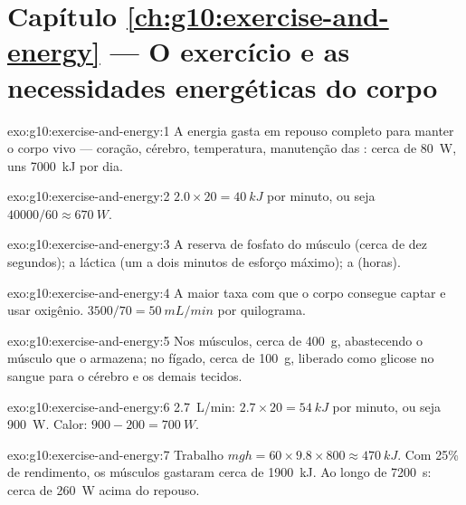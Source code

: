 \section*{Capítulo \ref{ch:g10:exercise-and-energy} --- O exercício e as necessidades energéticas do corpo}

\begin{solution}{exo:g10:exercise-and-energy:1}
A energia gasta em repouso completo para manter o corpo vivo ---
coração, cérebro, temperatura, manutenção das : cerca de
\qty{80}{W}, uns \qty{7000}{kJ} por dia.
\end{solution}

\begin{solution}{exo:g10:exercise-and-energy:2}
$2.0 \times 20 = \qty{40}{kJ}$ por minuto, ou seja $40000/60 \approx
\qty{670}{W}$.
\end{solution}

\begin{solution}{exo:g10:exercise-and-energy:3}
A reserva de fosfato do músculo (cerca de dez segundos); a 
láctica (um a dois minutos de esforço máximo); a 
(horas).
\end{solution}

\begin{solution}{exo:g10:exercise-and-energy:4}
A maior taxa com que o corpo consegue captar e usar oxigênio.
$3500/70 = \qty{50}{mL/min}$ por quilograma.
\end{solution}

\begin{solution}{exo:g10:exercise-and-energy:5}
Nos músculos, cerca de \qty{400}{g}, abastecendo o músculo que o
armazena; no fígado, cerca de \qty{100}{g}, liberado como glicose no
sangue para o cérebro e os demais tecidos.
\end{solution}

\begin{solution}{exo:g10:exercise-and-energy:6}
\qty{2.7}{L/min}: $2.7 \times 20 = \qty{54}{kJ}$ por minuto, ou seja
\qty{900}{W}. Calor: $900 - 200 = \qty{700}{W}$.
\end{solution}

\begin{solution}{exo:g10:exercise-and-energy:7}
Trabalho $mgh = 60 \times 9.8 \times 800 \approx \qty{470}{kJ}$. Com
25\% de rendimento, os músculos gastaram cerca de \qty{1900}{kJ}. Ao
longo de \qty{7200}{s}: cerca de \qty{260}{W} acima do repouso.
\end{solution}

